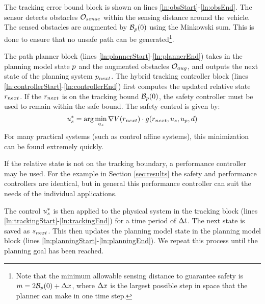 The tracking error bound block is shown on lines \ref{ln:obsStart}-\ref{ln:obsEnd}. The sensor detects obstacles $\mathcal{O}_{sense}$ within the sensing distance around the vehicle. The sensed obstacles are augmented by $\mathcal B_p(0)$ using the Minkowski sum. This is done to ensure that no unsafe path can be generated\footnote{Note that the minimum allowable sensing distance to guarantee safety is $m = 2\mathcal B_p(0) + \Delta x$, where $\Delta x$ is the largest possible step in space that the planner can make in one time step.}.


 The path planner block (lines \ref{ln:plannerStart}-\ref{ln:plannerEnd}) takes in the planning model state $p$ and the augmented obstacles $\mathcal{O}_{aug}$, and outputs the next state of the planning system $p_{next}$. The hybrid tracking controller block (lines \ref{ln:controllerStart}-\ref{ln:controllerEnd}) first computes the updated relative state $r_{next}$. If the $r_{next}$ is on the tracking bound $\mathcal B_p(0)$, the safety controller must be used to remain within the safe bound. The safety control is given by:
\begin{equation}
	u_s^* = \arg\min_{u_s} \nabla V(r_{next}) \cdot g(r_{next},u_s,u_p,d)
\end{equation}
For many practical systems (such as control affine systems), this minimization can be found extremely quickly.

If the relative state is not on the tracking boundary, a performance controller may be used. For the example in Section \ref{sec:results} the safety and performance controllers are identical, but in general this performance controller can suit the needs of the individual applications.

The control $u_s^*$ is then applied to the physical system in the tracking block (lines \ref{ln:trackingStart}-\ref{ln:trackingEnd}) for a time period of $\Delta t$. The next state is saved as $s_{next}$. This then updates the planning model state in the planning model block (lines \ref{ln:planningStart}-\ref{ln:planningEnd}). We repeat this process until the planning goal has been reached.